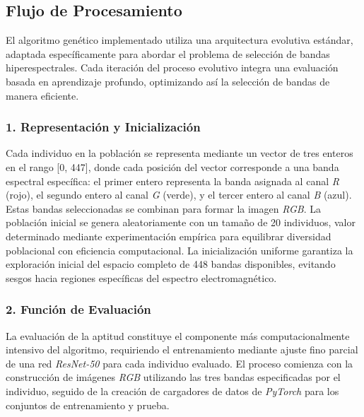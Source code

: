 \subsection{Flujo de Procesamiento}

El algoritmo genético implementado utiliza una arquitectura evolutiva estándar, adaptada específicamente para abordar el problema de selección de bandas hiperespectrales. Cada iteración del proceso evolutivo integra una evaluación basada en aprendizaje profundo, optimizando así la selección de bandas de manera eficiente.

\subsubsection{1. Representación y Inicialización}

Cada individuo en la población se representa mediante un vector de tres enteros en el rango [0, 447], donde cada posición del vector corresponde a una banda espectral específica: el primer entero representa la banda asignada al canal \emph{R} (rojo), el segundo entero al canal \emph{G} (verde), y el tercer entero al canal \emph{B} (azul). Estas bandas seleccionadas se combinan para formar la imagen \emph{RGB}. La población inicial se genera aleatoriamente con un tamaño de 20 individuos, valor determinado mediante experimentación empírica para equilibrar diversidad poblacional con eficiencia computacional. La inicialización uniforme garantiza la exploración inicial del espacio completo de 448 bandas disponibles, evitando sesgos hacia regiones específicas del espectro electromagnético.

\subsubsection{2. Función de Evaluación}

La evaluación de la aptitud constituye el componente más computacionalmente intensivo del algoritmo, requiriendo el entrenamiento mediante ajuste fino parcial de una red \emph{ResNet-50} para cada individuo evaluado. El proceso comienza con la construcción de imágenes \emph{RGB} utilizando las tres bandas especificadas por el individuo, seguido de la creación de cargadores de datos de \emph{PyTorch} para los conjuntos de entrenamiento y prueba.

\vspace{5mm}

